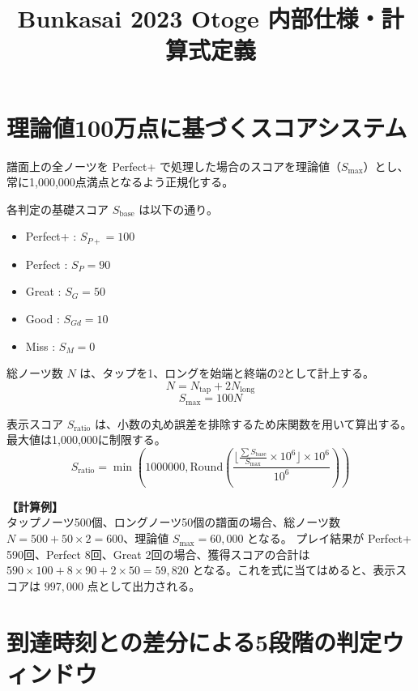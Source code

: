 \documentclass[a4paper,11pt]{ltjsarticle}
\title{Bunkasai 2023 Otoge 内部仕様・計算式定義}
\author{}
\date{}
\begin{document}
\maketitle

\section{理論値100万点に基づくスコアシステム}

譜面上の全ノーツを Perfect+ で処理した場合のスコアを理論値（$S_{\mathrm{max}}$）とし、常に1,000,000点満点となるよう正規化する。

各判定の基礎スコア $S_{\mathrm{base}}$ は以下の通り。
\begin{itemize}
    \item Perfect+ : $S_{P+} = 100$
    \item Perfect : $S_{P} = 90$
    \item Great : $S_{G} = 50$
    \item Good : $S_{Gd} = 10$
    \item Miss : $S_{M} = 0$
\end{itemize}

総ノーツ数 $N$ は、タップを1、ロングを始端と終端の2として計上する。
\begin{equation}
    N = N_{\mathrm{tap}} + 2N_{\mathrm{long}}
\end{equation}
\begin{equation}
    S_{\mathrm{max}} = 100 N
\end{equation}

表示スコア $S_{\mathrm{ratio}}$ は、小数の丸め誤差を排除するため床関数を用いて算出する。最大値は1,000,000に制限する。
\begin{equation}
    S_{\mathrm{ratio}} = \min \left( 1000000, \mathrm{Round} \left( \frac{ \lfloor \frac{\sum S_{\mathrm{base}}}{S_{\mathrm{max}}} \times 10^6 \rfloor \times 10^6 }{10^6} \right) \right)
\end{equation}

\textbf{【計算例】} \\
タップノーツ500個、ロングノーツ50個の譜面の場合、総ノーツ数 $N = 500 + 50 \times 2 = 600$、理論値 $S_{\mathrm{max}} = 60,000$ となる。
プレイ結果が Perfect+ 590回、Perfect 8回、Great 2回の場合、獲得スコアの合計は $590 \times 100 + 8 \times 90 + 2 \times 50 = 59,820$ となる。これを式に当てはめると、表示スコアは $997,000$ 点として出力される。

\section{到達時刻との差分による5段階の判定ウィンドウ}
\end{document}
